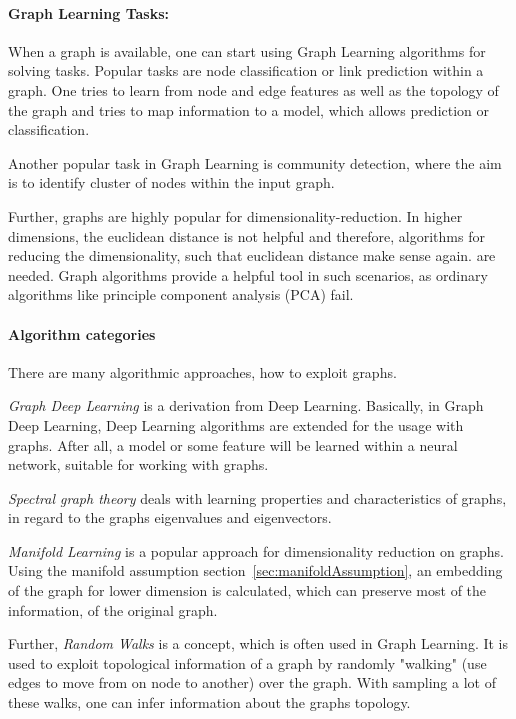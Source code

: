 \paragraph{Graph Learning Tasks:}
When a graph is available, one can start using Graph Learning algorithms for solving tasks.
Popular tasks are node classification or link prediction within a graph. One tries to learn from node and edge features 
as well as the topology of the graph and tries to map information to a model, which allows prediction or classification.

Another popular task in Graph Learning is community detection, where the aim is to identify cluster of nodes within the input graph.

Further, graphs are highly popular for dimensionality-reduction. In higher dimensions, the euclidean distance is not helpful and therefore,
algorithms for reducing the dimensionality, such that euclidean distance make sense again. are needed. 
Graph algorithms provide a helpful tool in such scenarios, as ordinary algorithms like principle component analysis (PCA) fail.

\paragraph{Algorithm categories}

There are many algorithmic approaches, how to exploit graphs. 

\textit{Graph Deep Learning} is a derivation from Deep Learning. 
Basically, in Graph Deep Learning, Deep Learning algorithms are extended for the usage with graphs.
After all, a model or some feature will be learned within a neural network, suitable for working with graphs.

\textit{Spectral graph theory}\cite{SpectralGraphTheory} deals with learning properties and characteristics of graphs, in regard to
the graphs eigenvalues and eigenvectors. 

\textit{Manifold Learning }\cite{ManifoldLearning} is a popular approach for dimensionality reduction on graphs. 
Using the manifold assumption section~\ref{sec:manifoldAssumption}, an embedding of the graph for lower dimension is calculated,
which can preserve most of the information, of the original graph.

Further, \textit{Random Walks} is a concept, which is often used in Graph Learning. 
It is used to exploit topological information of a graph by randomly "walking" (use edges to move from on node to another)
over the graph. With sampling a lot of these walks, one can infer information about the graphs topology.


